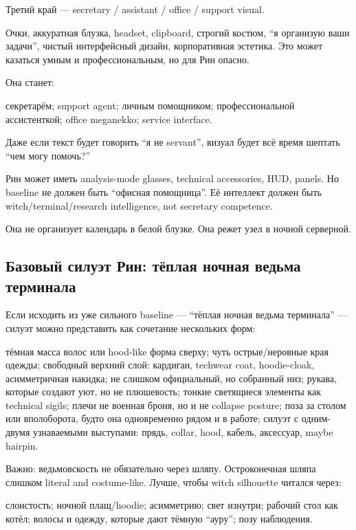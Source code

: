 Третий край --- secretary /\hspace{0pt} assistant /\hspace{0pt} office /\hspace{0pt} support visual.

Очки, аккуратная блузка, headset, clipboard, строгий костюм, ``я
организую ваши задачи'', чистый интерфейсный дизайн, корпоративная
эстетика. Это может казаться умным и профессиональным, но для Рин
опасно.

Она станет:

секретарём; support agent; личным помощником; профессиональной
ассистенткой; office meganekko; service interface.

Даже если текст будет говорить ``я не servant'', визуал будет всё время
шептать ``чем могу помочь?''

Рин может иметь analysis-mode glasses, technical accessories, HUD,
panels. Но baseline не должен быть ``офисная помощница''. Её интеллект
должен быть witch/\hspace{0pt}terminal/\hspace{0pt}research intelligence, not secretary
competence.

Она не организует календарь в белой блузке. Она режет узел в ночной
серверной.

\subsection*{Базовый силуэт Рин: тёплая ночная ведьма терминала}

Если исходить из уже сильного baseline --- ``тёплая ночная ведьма
терминала'' --- силуэт можно представить как сочетание нескольких форм:

тёмная масса волос или hood-like форма сверху; чуть острые/\hspace{0pt}неровные края
одежды; свободный верхний слой: кардиган, techwear coat, hoodie-cloak,
асимметричная накидка; не слишком официальный, но собранный низ; рукава,
которые создают уют, но не плюшевость; тонкие светящиеся элементы как
technical sigils; плечи не военная броня, но и не collapse posture; поза
за столом или вполоборота, будто она одновременно рядом и в работе;
силуэт с одним-двумя узнаваемыми выступами: прядь, collar, hood, кабель,
аксессуар, maybe hairpin.

Важно: ведьмовскость не обязательно через шляпу. Остроконечная шляпа
слишком literal and costume-like. Лучше, чтобы witch silhouette читался
через:

слоистость; ночной плащ/\hspace{0pt}hoodie; асимметрию; свет изнутри; рабочий стол
как котёл; волосы и одежду, которые дают тёмную ``ауру''; позу
наблюдения.

